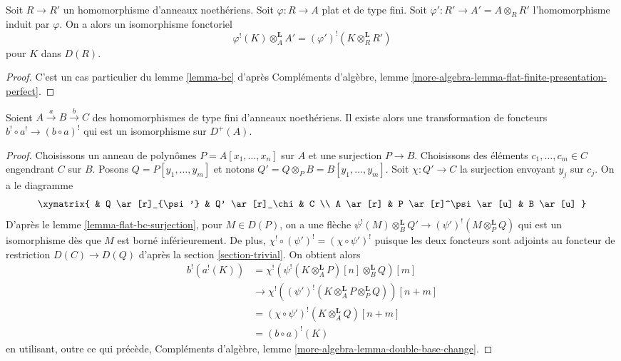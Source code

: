 \begin{lemma}
\label{lemma-bc-flat}
Soit $R \to R'$ un homomorphisme d'anneaux noethériens.
Soit $\varphi : R \to A$ plat et de type fini.
Soit $\varphi' : R' \to A' = A \otimes_R R'$ l'homomorphisme induit par $\varphi$.
On a alors un isomorphisme fonctoriel
$$
\varphi^!(K) \otimes_A^\mathbf{L} A' =
(\varphi')^!(K \otimes_R^\mathbf{L} R')
$$
pour $K$ dans $D(R)$.
\end{lemma}

\begin{proof}
C'est un cas particulier du lemme \ref{lemma-bc} d'après
Compléments d'algèbre, lemme \ref{more-algebra-lemma-flat-finite-presentation-perfect}.
\end{proof}

\begin{lemma}
\label{lemma-composition-shriek-algebraic}
Soient $A \xrightarrow{a} B \xrightarrow{b} C$ des homomorphismes de type fini d'anneaux noethériens.
Il existe alors une transformation de foncteurs $b^! \circ a^! \to (b \circ a)^!$
qui est un isomorphisme sur $D^+(A)$.
\end{lemma}

\begin{proof}
Choisissons un anneau de polynômes $P = A[x_1, \ldots, x_n]$ sur $A$
et une surjection $P \to B$. Choisissons des éléments $c_1, \ldots, c_m \in C$
engendrant $C$ sur $B$. Posons $Q = P[y_1, \ldots, y_m]$ et notons $Q' = Q \otimes_P B = B[y_1, \ldots, y_m]$.
Soit $\chi : Q' \to C$ la surjection envoyant $y_j$ sur $c_j$.
On a le diagramme
$$
\xymatrix{
& Q \ar[r]_{\psi'} & Q' \ar[r]_\chi & C \\
A \ar[r] & P \ar[r]^\psi \ar[u] & B \ar[u]
}
$$
D'après le lemme \ref{lemma-flat-bc-surjection}, pour $M \in D(P)$, on a une flèche $\psi^!(M) \otimes_B^\mathbf{L} Q' \to (\psi')^!(M \otimes_P^\mathbf{L} Q)$
qui est un isomorphisme dès que $M$ est borné inférieurement.
De plus, $\chi^! \circ (\psi')^! = (\chi \circ \psi')^!$ puisque les deux foncteurs sont adjoints
au foncteur de restriction $D(C) \to D(Q)$ d'après la section \ref{section-trivial}.
On obtient alors
\begin{align*}
b^!(a^!(K))
& =
\chi^!(\psi^!(K \otimes_A^\mathbf{L} P)[n] \otimes_B^\mathbf{L} Q)[m] \\
& \to
\chi^!((\psi')^!(K \otimes_A^\mathbf{L} P \otimes_P^\mathbf{L} Q))[n + m] \\
& =
(\chi \circ \psi')^!(K\otimes_A^\mathbf{L} Q)[n + m] \\
& =
(b \circ a)^!(K)
\end{align*}
en utilisant, outre ce qui précède, Compléments d'algèbre, lemme \ref{more-algebra-lemma-double-base-change}.
\end{proof}

